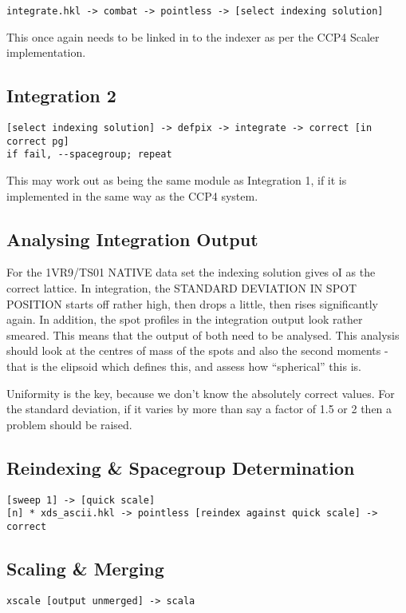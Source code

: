 \documentclass[a4paper, 11pt]{article}
\begin{document}
\begin{verbatim}
integrate.hkl -> combat -> pointless -> [select indexing solution]
\end{verbatim}

This once again needs to be linked in to the indexer as per the 
CCP4 Scaler implementation. 

\subsection{Integration 2}

\begin{verbatim}
[select indexing solution] -> defpix -> integrate -> correct [in correct pg]
if fail, --spacegroup; repeat
\end{verbatim}

This may work out as being the same module as Integration 1, if it is
implemented in the same way as the CCP4 system.

\subsection{Analysing Integration Output}

For the 1VR9/TS01 NATIVE data set the indexing solution gives oI as the 
correct lattice. In integration, the STANDARD DEVIATION IN SPOT POSITION 
starts off rather high, then drops a little, then rises significantly again.
In addition, the spot profiles in the integration output look rather smeared.
This means that the output of both need to be analysed. This analysis should 
look at the centres of mass of the spots and also the second moments - 
that is the elipsoid which defines this, and assess how ``spherical''
this is.

Uniformity is the key, because we don't know the absolutely correct values.
For the standard deviation, if it varies by more than say a factor of 1.5 or 
2 then a problem should be raised.

\subsection{Reindexing \& Spacegroup Determination}

\begin{verbatim}
[sweep 1] -> [quick scale]
[n] * xds_ascii.hkl -> pointless [reindex against quick scale] -> correct
\end{verbatim}

\subsection{Scaling \& Merging}

\begin{verbatim}
xscale [output unmerged] -> scala
\end{verbatim}
\end{document}
